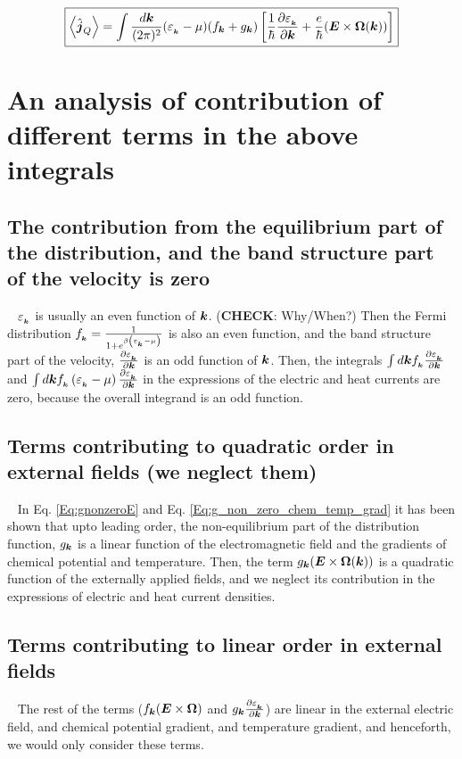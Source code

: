 \documentclass{report}
\renewcommand\vec[1]{\ensuremath\boldsymbol{#1}} %
\begin{document}
\begin{equation} \label{Eq:heat-current-simplified}
	\boxed{\expval{\hat{\vec{j}}_Q} = \int \frac{d\vec{k}}{(2\pi)^2} (\varepsilon_{_{\vec{k}}} - \mu) ({f}_{\vec{k}} + {g}_{\vec{k}}) \left[\frac{1}{\hbar} \frac{\partial \varepsilon_{_{\vec{k}}}}{\partial \vec{k}} + \frac{e}{\hbar} (\vec{E}\times\vec{\Omega}(\vec{k}))\right]}
\end{equation}
\section{An analysis of contribution of different terms in the above integrals}
\subsection{The contribution from the equilibrium part of the distribution, and the band structure part of the velocity is \textbf{zero}}~\label{sec:zeroCont}
$\varepsilon_{_{\vec{k}}}$ is usually an even function of $\vec{k}$. (\textbf{CHECK}: Why/When?) Then the Fermi distribution $f_{_{\vec{k}}} = \frac{1}{1+ e^{\beta\left(\varepsilon_{_{\vec{k}}} - \mu\right)}}$ is also an even function, and the band structure part of the velocity, $\frac{\partial \varepsilon_{_{\vec{k}}}}{\partial \vec{k}}$ is an odd function of $\vec{k}$. Then, the integrals $\int d\vec{k} f_{_{\vec{k}}} \frac{\partial \varepsilon_{_{\vec{k}}}}{\partial \vec{k}}$ and $\int d\vec{k} f_{_{\vec{k}}} \left(\varepsilon_{_{\vec{k}}} - \mu\right) \frac{\partial \varepsilon_{_{\vec{k}}}}{\partial \vec{k}}$ in the expressions of the electric and heat currents are zero, because the overall integrand is an odd function.
\subsection{Terms contributing to quadratic order  in external fields (we neglect them)}~\label{sec:quadCont}
In Eq. \eqref{Eq:gnonzeroE} and Eq. \eqref{Eq:g_non_zero_chem_temp_grad} it has been shown that upto leading order, the non-equilibrium part of the distribution function, ${g}_{\vec{k}}$ is a linear function of the electromagnetic field and the gradients of chemical potential and temperature. Then, the term ${g}_{\vec{k}} (\vec{E}\times\vec{\Omega}(\vec{k}))$ is a quadratic function of the externally applied fields, and we neglect its contribution in the expressions of electric and heat current densities.
\subsection{Terms contributing to linear order in external fields}~\label{sec:linearCont}
The rest of the terms ($ {f}_{\vec{k}} (\vec{E}\times\vec{\Omega}) $ and ${g}_{\vec{k}} \frac{\partial \varepsilon_{_{\vec{k}}}}{\partial \vec{k}}$) are linear in the external electric field, and chemical potential gradient, and temperature gradient, and henceforth, we would only consider these terms.
\end{document}
